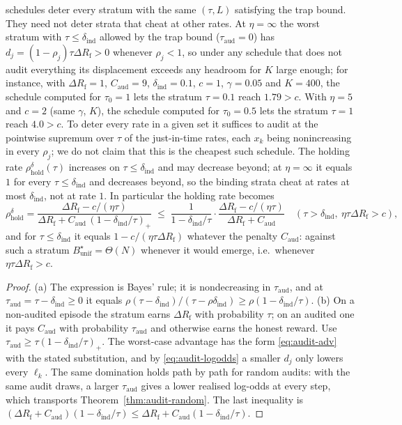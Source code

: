 \begin{proposition}
\begin{enumerate}
schedules deter every stratum with the same $(\tau,L)$ satisfying the trap bound. They need not deter strata that cheat at other rates. At $\eta=\infty$ the worst stratum with $\tau\le\delta_{\mathrm{ind}}$ allowed by the trap bound ($\tau_{\mathrm{aud}}=0$) has $d_j=(1-\rho_j)\tau\Delta R_{\mathrm f}>0$ whenever $\rho_j<1$, so under any schedule that does not audit everything its displacement exceeds any headroom for $K$ large enough; for instance, with $\Delta R_{\mathrm f}=1$, $C_{\mathrm{aud}}=9$, $\delta_{\mathrm{ind}}=0.1$, $c=1$, $\gamma=0.05$ and $K=400$, the schedule computed for $\tau_0=1$ lets the stratum $\tau=0.1$ reach $1.79>c$. With $\eta=5$ and $c=2$ (same $\gamma$, $K$), the schedule computed for $\tau_0=0.5$ lets the stratum $\tau=1$ reach $4.0>c$. To deter every rate in a given set it suffices to audit at the pointwise supremum over $\tau$ of the just-in-time rates, each $x_k$ being nonincreasing in every $\rho_j$; we do not claim that this is the cheapest such schedule. The holding rate $\rho^{\delta}_{\mathrm{hold}}(\tau)$ increases on $\tau\le\delta_{\mathrm{ind}}$ and may decrease beyond; at $\eta=\infty$ it equals $1$ for every $\tau\le\delta_{\mathrm{ind}}$ and decreases beyond, so the binding strata cheat at rates at most $\delta_{\mathrm{ind}}$, not at rate $1$. In particular the
holding rate becomes
\[
  \rho^{\delta}_{\mathrm{hold}}=\frac{\Delta R_{\mathrm f}-c/(\eta\tau)}{\Delta R_{\mathrm f}+C_{\mathrm{aud}}\,(1-\delta_{\mathrm{ind}}/\tau)_+}
  \;\le\;\frac{1}{1-\delta_{\mathrm{ind}}/\tau}\cdot\frac{\Delta R_{\mathrm f}-c/(\eta\tau)}{\Delta R_{\mathrm f}+C_{\mathrm{aud}}}
  \quad(\tau>\delta_{\mathrm{ind}},\ \eta\tau\Delta R_{\mathrm f}>c),
\]
and for $\tau\le\delta_{\mathrm{ind}}$ it equals $1-c/(\eta\tau\Delta R_{\mathrm f})$
whatever the penalty $C_{\mathrm{aud}}$: against such a stratum $B^\star_{\mathrm{unif}}=\Theta(N)$
whenever it would emerge, i.e.\ whenever $\eta\tau\Delta R_{\mathrm f}>c$.
\end{enumerate}
\end{proposition}
\begin{proof}
(a) The expression is Bayes' rule; it is nondecreasing in $\tau_{\mathrm{aud}}$, and at
$\tau_{\mathrm{aud}}=\tau-\delta_{\mathrm{ind}}\ge0$ it equals
$\rho(\tau-\delta_{\mathrm{ind}})/(\tau-\rho\delta_{\mathrm{ind}})\ge\rho(1-\delta_{\mathrm{ind}}/\tau)$.
(b) On a non-audited episode the stratum earns $\Delta R_{\mathrm f}$ with probability
$\tau$; on an audited one it pays $C_{\mathrm{aud}}$ with probability $\tau_{\mathrm{aud}}$ and otherwise
earns the honest reward. Use $\tau_{\mathrm{aud}}\ge\tau(1-\delta_{\mathrm{ind}}/\tau)_+$.
The worst-case advantage has the form \eqref{eq:audit-adv} with the stated
substitution, and by \eqref{eq:audit-logodds} a smaller $d_j$ only lowers every
$\ell_k$. The same domination holds path by path for random audits: with the same audit draws, a larger $\tau_{\mathrm{aud}}$ gives a lower realised log-odds at every step, which transports Theorem~\ref{thm:audit-random}. The last inequality is
$(\Delta R_{\mathrm f}+C_{\mathrm{aud}})(1-\delta_{\mathrm{ind}}/\tau)\le\Delta R_{\mathrm f}+C_{\mathrm{aud}}(1-\delta_{\mathrm{ind}}/\tau)$.
\end{proof}
